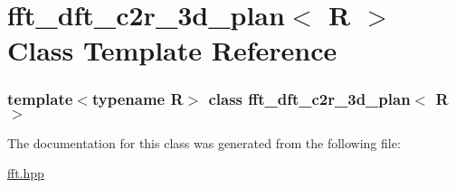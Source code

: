 \hypertarget{classfft__dft__c2r__3d__plan}{
\section{fft\_\-dft\_\-c2r\_\-3d\_\-plan$<$ R $>$ Class Template Reference}
\label{classfft__dft__c2r__3d__plan}
}
\subsubsection*{template$<$typename R$>$ class fft\_\-dft\_\-c2r\_\-3d\_\-plan$<$ R $>$}



The documentation for this class was generated from the following file:\begin{DoxyCompactItemize}
\item 
\hyperlink{fft_8hpp}{fft.hpp}\end{DoxyCompactItemize}
